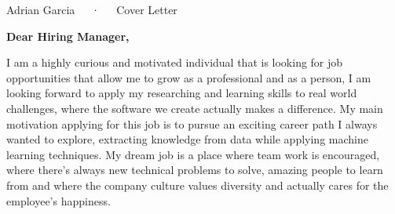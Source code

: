 \documentclass[11pt, a4paper]{awesome-cv}
\begin{document}
\makecvheader[R]

\makecvfooter
  {}
  {Adrian Garcia~~~·~~~Cover Letter}
  {}

\begin{cvletter}

\textbf{Dear Hiring Manager,}

I am a highly curious and motivated individual that is looking for job opportunities that allow me to grow as a professional and as a person, I am looking forward to apply my researching and learning skills to real world challenges, where the software we create actually makes a difference. My main motivation applying for this job is to pursue an exciting career path I always wanted to explore, extracting knowledge from data while applying machine learning techniques. My dream job is a place where team work is encouraged, where there’s always new technical problems to solve, amazing people to learn from and where the company culture values diversity and actually cares for the employee’s happiness.




\end{cvletter}
\end{document}
